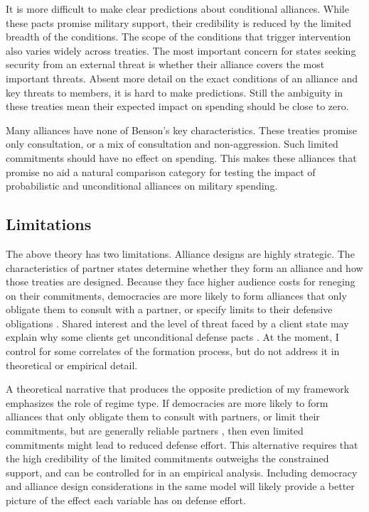 \documentclass[12pt]{article}
\begin{document}
It is more difficult to make clear predictions about conditional alliances. While these pacts promise military support, their credibility is reduced by the limited breadth of the conditions. The scope of the conditions that trigger intervention also varies widely across treaties. The most important concern for states seeking security from an external threat is whether their alliance covers the most important threats. Absent more detail on the exact conditions of an alliance and key threats to members, it is hard to make predictions. Still the ambiguity in these treaties mean their expected impact on spending should be close to zero.

Many alliances have none of Benson's key characteristics. These treaties promise only consultation, or a mix of consultation and non-aggression. Such limited commitments should have no effect on spending. This makes these alliances that promise no aid a natural comparison category for testing the impact of probabilistic and unconditional alliances on military spending. 

\subsection*{Limitations} 

The above theory has two limitations. Alliance designs are highly strategic. The characteristics of partner states determine whether they form an alliance and how those treaties are designed. Because they face higher audience costs for reneging on their commitments, democracies are more likely to form alliances that only obligate them to consult with a partner, or specify limits to their defensive obligations \citep{Chibaetal2015}. Shared interest and the level of threat faced by a client state may explain why some clients get unconditional defense pacts \citep{Yarhi-Miloetal2016}. At the moment, I control for some correlates of the formation process, but do not address it in theoretical or empirical detail.

A theoretical narrative that produces the opposite prediction of my framework emphasizes the role of regime type. If democracies are more likely to form alliances that only obligate them to consult with partners, or limit their commitments, but are generally reliable partners \citep{Chibaetal2015, DigiuseppePoast2016}, then even limited commitments might lead to reduced defense effort. This alternative requires that the high credibility of the limited commitments outweighs the constrained support, and can be controlled for in an empirical analysis. Including democracy and alliance design considerations in the same model will likely provide a better picture of the effect each variable has on defense effort. 
\end{document}
